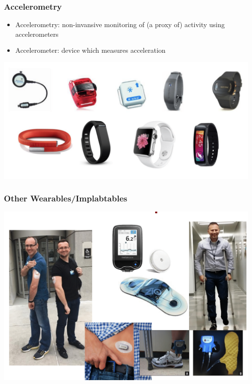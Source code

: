 \documentclass[10pt]{beamer}\usepackage[]{graphicx}\usepackage[]{color}
\begin{document}
\begin{frame}
\frametitle{Accelerometry}
\begin{itemize}
\item Accelerometry: non-invansive monitoring of (a proxy of) activity using accelerometers
\item Accelerometer: device which measures acceleration
\end{itemize}
\includegraphics[width=\textwidth]{accelerometers_example}
\end{frame}







\begin{frame}
\frametitle{Other Wearables/Implabtables}
\includegraphics[width=\textwidth]{wearables_example}
\end{frame}
\end{document}

